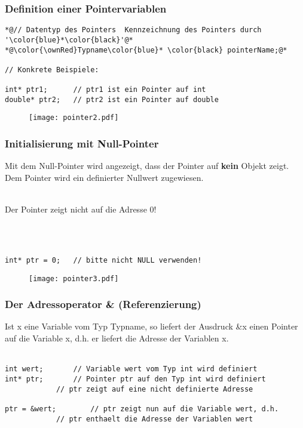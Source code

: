 \subsubsection{Definition einer Pointervariablen\hfill}
\label{sec:unterunterabschnitt}
\noindent
\begin{minipage}{\linewidth}
\begin{lstlisting}
*@// Datentyp des Pointers	Kennzeichnung des Pointers durch '\color{blue}*\color{black}'@*
*@\color{\ownRed}Typname\color{blue}* \color{black} pointerName;@*

// Konkrete Beispiele:

int* ptr1;		// ptr1 ist ein Pointer auf int
double* ptr2;	// ptr2 ist ein Pointer auf double
\end{lstlisting}
\end{minipage}
\begin{figure}[h]
	\centering
	\texttt{[image: pointer2.pdf]}
\end{figure}

\subsubsection{Initialisierung mit Null-Pointer\hfill}
\label{sec_unterunterabschnitt}
Mit dem Null-Pointer wird angezeigt, dass der Pointer auf \textbf{kein} Objekt zeigt. Dem Pointer wird ein definierter Nullwert zugewiesen.\\
\\
\begin{hinweis}
Der Pointer zeigt nicht auf die Adresse 0!
\end{hinweis}
\\
\\
\noindent
\begin{minipage}{\linewidth}
\begin{lstlisting}
int* ptr = 0;	// bitte nicht NULL verwenden!
\end{lstlisting}
\end{minipage}
\begin{figure}[h]
	\centering
	\texttt{[image: pointer3.pdf]}
\end{figure}

\subsubsection{Der Adressoperator \& \textbf{(Referenzierung)}\hfill}
\label{sec:unterunterabschnitt}
Ist x eine Variable vom Typ Typname, so liefert der Ausdruck \&x einen Pointer auf die Variable x, d.h. er liefert die Adresse der Variablen x.\\
\\
\noindent
\begin{minipage}{\linewidth}
\begin{lstlisting}
int wert;		// Variable wert vom Typ int wird definiert
int* ptr;		// Pointer ptr auf den Typ int wird definiert
			// ptr zeigt auf eine nicht definierte Adresse
		
ptr = &wert;		// ptr zeigt nun auf die Variable wert, d.h. 
			// ptr enthaelt die Adresse der Variablen wert
\end{lstlisting}
\end{minipage}

